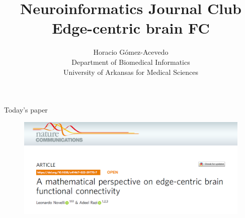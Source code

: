 \documentclass{beamer}
\title{Neuroinformatics Journal Club\\ Edge-centric brain FC }
\author{Horacio G\'omez-Acevedo\\ Department of Biomedical Informatics\\
	University of Arkansas for Medical Sciences}
\begin{document}
	\begin{frame}[plain]
		\maketitle
	\end{frame}
	
	\begin{frame}{Today's paper}
		\begin{figure}[h]
			\centering
				\includegraphics[scale=0.45]{../Figures/novelli_paper.png}
		\end{figure}
	\end{frame}
	
\end{document}
